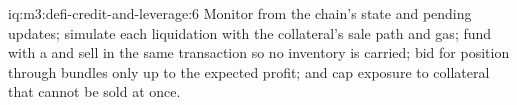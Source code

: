 \begin{solution}{iq:m3:defi-credit-and-leverage:6}
Monitor  from the chain's state and pending  updates; simulate each liquidation with the collateral's sale path and gas; fund with a
 and sell in the same transaction so no inventory is carried; bid for position through bundles only up to the expected profit; and cap exposure
to collateral that cannot be sold at once.
\end{solution}
